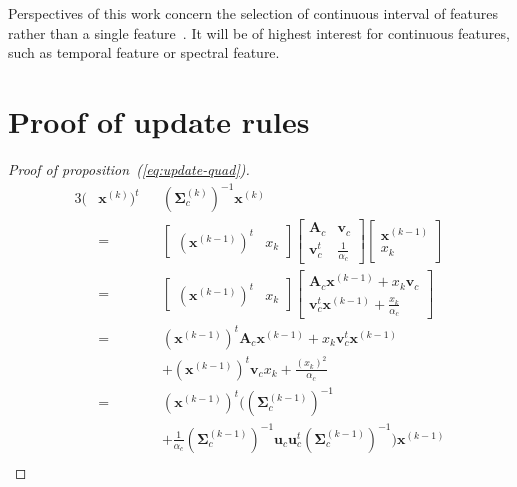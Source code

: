 \documentclass[journal,10pt]{IEEEtran}
\begin{document}
Perspectives of this work concern the selection of continuous interval of features rather than a single feature~\cite{serpico2007extraction,1468090}. It will be of  highest interest for continuous features, such as temporal feature or spectral feature.

\appendices
\section{Proof of update rules}
\label{app:proof-update}

\begin{proof}[Proof of proposition~(\ref{eq:update-quad})]
    \begin{alignat*}{3}
    (&\mathbf{x}^{(k)})^t && (\boldsymbol{\Sigma}^{(k)}_c)^{-1} \mathbf{x}^{(k)} \\
     &= &&\left[\begin{array}{cc} (\mathbf{x}^{(k-1)})^t   & x_k \end{array}\right]
        \left[\begin{array}{cc}
            \mathbf{A}_c   & \mathbf{v}_c \\
            \mathbf{v}_c^t & \frac{1}{\alpha_c}
        \end{array}\right]
        \left[\begin{array}{c} \mathbf{x}^{(k-1)} \\ x_k \end{array}\right] \\
     &= &&\left[\begin{array}{cc} (\mathbf{x}^{(k-1)})^t   & x_k \end{array}\right]
            \left[\begin{array}{c} \mathbf{A}_c \mathbf{x}^{(k-1)} + x_k \mathbf{v}_c \\ \mathbf{v}_c^t \mathbf{x}^{(k-1)} + \frac{x_k}{\alpha_c} \end{array}\right] \\
     &= &&(\mathbf{x}^{(k-1)})^t \mathbf{A}_c \mathbf{x}^{(k-1)} + x_k \mathbf{v}_c^t \mathbf{x}^{(k-1)} \\
     & &&+ (\mathbf{x}^{(k-1)})^t \mathbf{v}_c x_k + \frac{(x_k)^2}{\alpha_c} \\
     &= &&(\mathbf{x}^{(k-1)})^t \Big((\boldsymbol{\Sigma}_c^{(k-1)})^{-1} \\
     & &&+ \frac{1}{\alpha_c} (\boldsymbol{\Sigma}_c^{(k-1)})^{-1} \mathbf{u}_c \mathbf{u}_c^t (\boldsymbol{\Sigma}_c^{(k-1)})^{-1}\Big) \mathbf{x}^{(k-1)}\\

\end{alignat*}
\end{proof}
\end{document}
